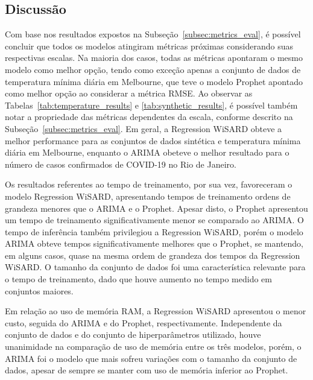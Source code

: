\FloatBarrier

\subsection{Discussão}
Com base nos resultados expostos na Subseção~\ref{subsec:metrics_eval}, é possível concluir que todos os modelos atingiram métricas próximas considerando suas respectivas escalas. Na maioria dos casos, todas as métricas apontaram o mesmo modelo como melhor opção, tendo como exceção apenas a conjunto de dados de temperatura mínima diária em Melbourne, que teve o modelo Prophet apontado como melhor opção ao considerar a métrica RMSE. Ao observar as Tabelas~\ref{tab:temperature_results} e \ref{tab:synthetic_results}, é possível também notar a propriedade das métricas dependentes da escala, conforme descrito na Subseção~\ref{subsec:metrics_eval}. Em geral, a Regression WiSARD obteve a melhor performance para as conjuntos de dados sintética e temperatura mínima diária em Melbourne, enquanto o ARIMA obeteve o melhor resultado para o número de casos confirmados de COVID-19 no Rio de Janeiro.

Os resultados referentes ao tempo de treinamento, por sua vez, favoreceram o modelo Regression WiSARD, apresentando tempos de treinamento ordens de grandeza menores que o ARIMA e o Prophet. Apesar disto, o Prophet apresentou um tempo de treinamento significativamente menor se comparado ao ARIMA. O tempo de inferência também privilegiou a Regression WiSARD, porém o modelo ARIMA obteve tempos significativamente melhores que o Prophet, se mantendo, em alguns casos, quase na mesma ordem de grandeza dos tempos da Regression WiSARD. O tamanho da conjunto de dados foi uma característica relevante para o tempo de treinamento, dado que houve aumento no tempo medido em conjuntos maiores.

Em relação ao uso de memória RAM, a Regression WiSARD apresentou o menor custo, seguida do ARIMA e do Prophet, respectivamente. Independente da conjunto de dados e do conjunto de hiperparâmetros utilizado, houve unanimidade na comparação de uso de memória entre os três modelos, porém, o ARIMA foi o modelo que mais sofreu variações com o tamanho da conjunto de dados, apesar de sempre se manter com uso de memória inferior ao Prophet.